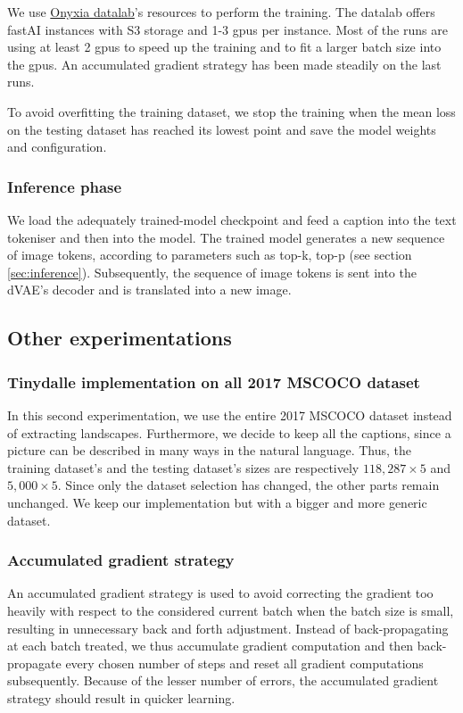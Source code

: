 \documentclass{article}
\begin{document}
\begin{multicols}{2}
We use \href{https://datalab.sspcloud.fr/}{Onyxia datalab}'s resources to perform the training. The datalab offers fastAI instances with S3 storage and 1-3 \acrshort{gpu}s per instance. Most of the runs are using at least 2 \acrshort{gpu}s to speed up the training and to fit a larger batch size into the \acrshort{gpu}s. An accumulated gradient strategy has been made steadily on the last runs.

To avoid overfitting the training dataset, we stop the training when the mean loss on the testing dataset has reached its lowest point and save the model weights and configuration.

\subsubsection{Inference phase}

We load the adequately trained-model checkpoint and feed a caption into the text tokeniser and then into the model. The trained model generates a new sequence of image tokens, according to parameters such as top-k, top-p (see section \ref{sec:inference}). Subsequently, the sequence of image tokens is sent into the dVAE's decoder and is translated into a new image.

\subsection{Other experimentations}

\subsubsection{Tinydalle implementation on all 2017 MSCOCO dataset}

In this second experimentation, we use the entire 2017 MSCOCO dataset instead of extracting landscapes. Furthermore, we decide to keep all the captions, since a picture can be described in many ways in the natural language. Thus, the training dataset's and the testing dataset's sizes are respectively $118,287\times 5$ and $5,000 \times 5$.
Since only the dataset selection has changed, the other parts remain unchanged. We keep our implementation but with a bigger and more generic dataset.

\subsubsection{Accumulated gradient strategy}

An accumulated gradient strategy is used to avoid correcting the gradient too heavily with respect to the considered current batch when the batch size is small, resulting in unnecessary back and forth adjustment. Instead of back-propagating at each batch treated, we thus accumulate gradient computation and then back-propagate every chosen number of steps and reset all gradient computations subsequently. Because of the lesser number of errors, the accumulated gradient strategy should result in quicker learning.


\end{multicols}
\end{document}
